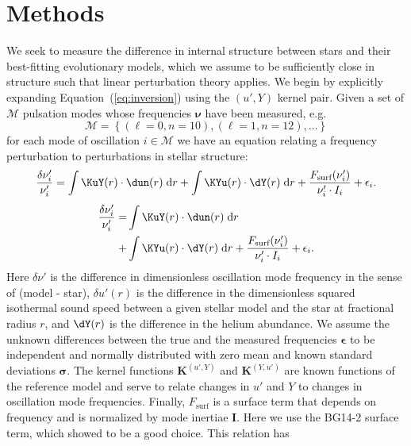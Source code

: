 {}
\section{Methods}
We seek to measure the difference in internal structure between stars and their best-fitting evolutionary models, which we assume to be sufficiently close in structure such that linear perturbation theory applies. 
We begin by explicitly expanding Equation~(\ref{eq:inversion}) using the ${(u', Y)}$ kernel pair. 
Given a set of $\mathscr{M}$ pulsation modes whose frequencies $\boldsymbol\nu$ have been measured, e.g.\ $$\mathscr{M}=\left\{(\ell=0, n=10), (\ell=1, n=12), \ldots\right\}$$ for each mode of oscillation ${i\in\mathscr{M}}$ we have an equation relating a frequency perturbation to perturbations in stellar structure: 
\ifhbonecolumn
\begin{equation} \label{eq:forward2} 
         \frac{\delta\nu_i'}{\nu_i'} 
         = 
          \int \KuY(r) \cdot \dun(r) \; \text{d}r 
         +\int \KYu(r) \cdot \dY(r)  \; \text{d}r 
         +\frac{F_{\text{surf}}(\nu_i')}{\nu_i'\cdot I_i} 
         +\epsilon_i. 
\end{equation} 
\else
\begin{align} \label{eq:forward2} 
         \frac{\delta\nu_i'}{\nu_i'} 
         = 
         &\int \KuY(r) \cdot \dun(r) \; \text{d}r 
\notag\\+&\int \KYu(r) \cdot \dY(r)  \; \text{d}r 
         +\frac{F_{\text{surf}}(\nu_i')}{\nu_i'\cdot I_i} 
         +\epsilon_i. 
\end{align} 
\fi
Here $\delta \nu'$ is the difference in dimensionless oscillation mode frequency in the sense of (model - star), 
$\delta u'(r)$ is the difference in the dimensionless squared isothermal sound speed between a given stellar model and the star at fractional radius $r$, 
and $\dY(r)$ is the difference in the helium abundance. 
We assume the unknown differences between the true and the measured frequencies $\boldsymbol\epsilon$ to be independent and normally distributed with zero mean and known standard deviations $\boldsymbol{\sigma}$. 
The kernel functions $\boldsymbol{K}^{(u', Y)}$ and $\boldsymbol{K}^{(Y, u')}$ are known functions of the reference model and serve to relate changes in $u'$ and $Y$ to changes in oscillation mode frequencies. 
Finally, $F_{\text{surf}}$ is a surface term that depends on frequency and is normalized by mode inertiae $\boldsymbol{I}$. Here we use the BG14-2 surface term, which \citet{2015ApJ...808..123S} showed to be a good choice. This relation has 
